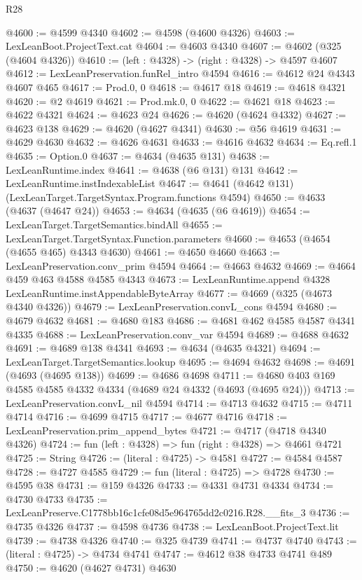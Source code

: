 \begin{lexlean}{R28}
\begin{coremodule}
@4600 := @4599 @4340
@4602 := @4598 (@4600 @4326)
@4603 := LexLeanBoot.ProjectText.cat
@4604 := @4603 @4340
@4607 := @4602 (@325 (@4604 @4326))
@4610 := (left : @4328) -> (right : @4328) -> @4597 @4607
@4612 := LexLeanPreservation.funRel_intro @4594
@4616 := @4612 @24 @4343 @4607 @465
@4617 := Prod.{0, 0}
@4618 := @4617 @18
@4619 := @4618 @4321
@4620 := @2 @4619
@4621 := Prod.mk.{0, 0}
@4622 := @4621 @18
@4623 := @4622 @4321
@4624 := @4623 @24
@4626 := @4620 (@4624 @4332)
@4627 := @4623 @138
@4629 := @4620 (@4627 @4341)
@4630 := @56 @4619
@4631 := @4629 @4630
@4632 := @4626 @4631
@4633 := @4616 @4632
@4634 := Eq.refl.{1}
@4635 := Option.{0}
@4637 := @4634 (@4635 @131)
@4638 := LexLeanRuntime.index
@4641 := @4638 (@6 @131) @131
@4642 := LexLeanRuntime.instIndexableList
@4647 := @4641 (@4642 @131) (LexLeanTarget.TargetSyntax.Program.functions @4594)
@4650 := @4633 (@4637 (@4647 @24))
@4653 := @4634 (@4635 (@6 @4619))
@4654 := LexLeanTarget.TargetSemantics.bindAll
@4655 := LexLeanTarget.TargetSyntax.Function.parameters
@4660 := @4653 (@4654 (@4655 @465) @4343 @4630)
@4661 := @4650 @4660
@4663 := LexLeanPreservation.conv_prim @4594
@4664 := @4663 @4632
@4669 := @4664 @459 @463 @4588 @4585 @4343
@4673 := LexLeanRuntime.append @4328 LexLeanRuntime.instAppendableByteArray
@4677 := @4669 (@325 (@4673 @4340 @4326))
@4679 := LexLeanPreservation.convL_cons @4594
@4680 := @4679 @4632
@4681 := @4680 @183
@4686 := @4681 @462 @4585 @4587 @4341 @4335
@4688 := LexLeanPreservation.conv_var @4594
@4689 := @4688 @4632
@4691 := @4689 @138 @4341
@4693 := @4634 (@4635 @4321)
@4694 := LexLeanTarget.TargetSemantics.lookup
@4695 := @4694 @4632
@4698 := @4691 (@4693 (@4695 @138))
@4699 := @4686 @4698
@4711 := @4680 @403 @169 @4585 @4585 @4332 @4334 (@4689 @24 @4332 (@4693 (@4695 @24)))
@4713 := LexLeanPreservation.convL_nil @4594
@4714 := @4713 @4632
@4715 := @4711 @4714
@4716 := @4699 @4715
@4717 := @4677 @4716
@4718 := LexLeanPreservation.prim_append_bytes
@4721 := @4717 (@4718 @4340 @4326)
@4724 := fun (left : @4328) => fun (right : @4328) => @4661 @4721
@4725 := String
@4726 := (literal : @4725) -> @4581
@4727 := @4584 @4587
@4728 := @4727 @4585
@4729 := fun (literal : @4725) => @4728
@4730 := @4595 @38
@4731 := @159 @4326
@4733 := @4331 @4731 @4334
@4734 := @4730 @4733
@4735 := LexLeanPreserve.C1778bb16c1cfe08d5e964765dd2c0216.R28.__fits_3
@4736 := @4735 @4326
@4737 := @4598 @4736
@4738 := LexLeanBoot.ProjectText.lit
@4739 := @4738 @4326
@4740 := @325 @4739
@4741 := @4737 @4740
@4743 := (literal : @4725) -> @4734 @4741
@4747 := @4612 @38 @4733 @4741 @489
@4750 := @4620 (@4627 @4731) @4630

\end{coremodule}
\end{lexlean}
